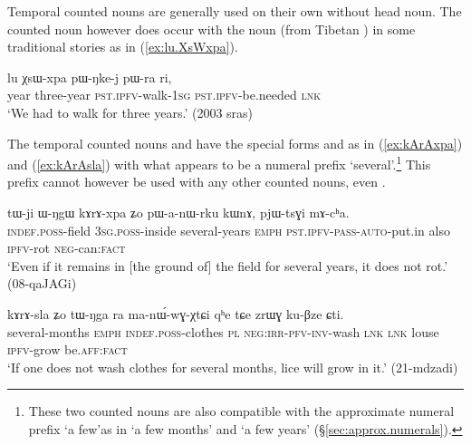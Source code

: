 Temporal counted nouns are generally used on their own without head noun. The counted noun  however does occur with the noun  (from Tibetan ) in some traditional stories as in (\ref{ex:lu.XsWxpa}).

\begin{exe}
\ex \label{ex:lu.XsWxpa}
\gll lu χsɯ-xpa pɯ-ŋke-j pɯ-ra ri, \\
year three-year \textsc{pst}.\textsc{ipfv}-walk-\textsc{1sg} \textsc{pst}.\textsc{ipfv}-be.needed \textsc{lnk} \\
\glt `We had to walk for three years.' (2003 sras)
\end{exe} 

The temporal counted nouns  and  have the special forms  and  as in (\ref{ex:kArAxpa}) and (\ref{ex:kArAsla}) with what appears to be a numeral prefix  `several'.\footnote{These two counted nouns are also compatible with the approximate numeral prefix  `a few'as in  `a few months' and  `a few years' (§\ref{sec:approx.numerals}).
} This prefix cannot however be used with any other counted nouns, even . 


\begin{exe}
\ex \label{ex:kArAxpa}
\gll tɯ-ji ɯ-ŋgɯ kɤrɤ-xpa ʑo pɯ-a-nɯ-rku kɯnɤ, pjɯ-tsɣi mɤ-cʰa. \\
\textsc{indef}.\textsc{poss}-field \textsc{3sg}.\textsc{poss}-inside several-years \textsc{emph} \textsc{pst}.\textsc{ipfv}-\textsc{pass}-\textsc{auto}-put.in also \textsc{ipfv}-rot \textsc{neg}-can:\textsc{fact} \\
\glt `Even if it remains in [the ground of] the field for several years, it does not rot.' (08-qaJAGi)
\end{exe}

\begin{exe}
\ex \label{ex:kArAsla}
\gll kɤrɤ-sla ʑo tɯ-ŋga ra ma-nɯ́-wɣ-χtɕi qʰe tɕe zrɯɣ ku-βze ɕti.  \\
several-months \textsc{emph} \textsc{indef}.\textsc{poss}-clothes \textsc{pl} \textsc{neg}:\textsc{irr}-\textsc{pfv}-\textsc{inv}-wash \textsc{lnk} \textsc{lnk} louse \textsc{ipfv}-grow be.\textsc{aff}:\textsc{fact} \\
\glt `If one does not wash clothes for several months, lice will grow in it.' (21-mdzadi)
\end{exe}


